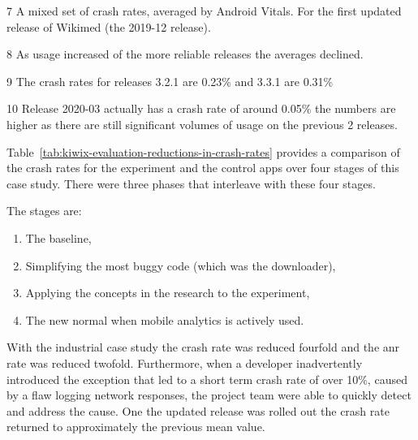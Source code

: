 \begin{table}
\begin{center}
\begin{threeparttable}
\begin{tablenotes}
  \item[7] A mixed set of crash rates, averaged by Android Vitals. For the first updated release of Wikimed (the 2019-12 release).
  \item[8] As usage increased of the more reliable releases the averages declined.
  \item[9] The crash rates for releases 3.2.1 are 0.23\% and 3.3.1 are 0.31\%
  \item[10] Release 2020-03 actually has a crash rate of around 0.05\% the numbers are higher as there are still significant volumes of usage on the previous 2 releases.
\end{tablenotes}
\end{threeparttable}
\end{center}
\label{tab:kiwix-evaluation-reductions-in-crash-rates}
\end{table}

Table~\ref{tab:kiwix-evaluation-reductions-in-crash-rates} provides a comparison of the crash rates for the experiment and the control apps over four stages of this case study. There were three phases that interleave with these four stages.

The stages are:
\begin{enumerate}
    \itemsep0em
    \item The baseline,
    \item Simplifying the most buggy code (which was the downloader),
    \item Applying the concepts in the research to the experiment,
    \item The new normal when mobile analytics is actively used.
\end{enumerate}

With the  industrial case study the crash rate was reduced fourfold and the \Gls{anr} rate was reduced twofold. 
Furthermore, when a developer inadvertently introduced the exception that led to a short term crash rate of over 10\%, caused by a flaw logging  network responses, the project team were able to quickly detect and address the cause. One the updated release was rolled out the crash rate returned to approximately the previous mean value.  

